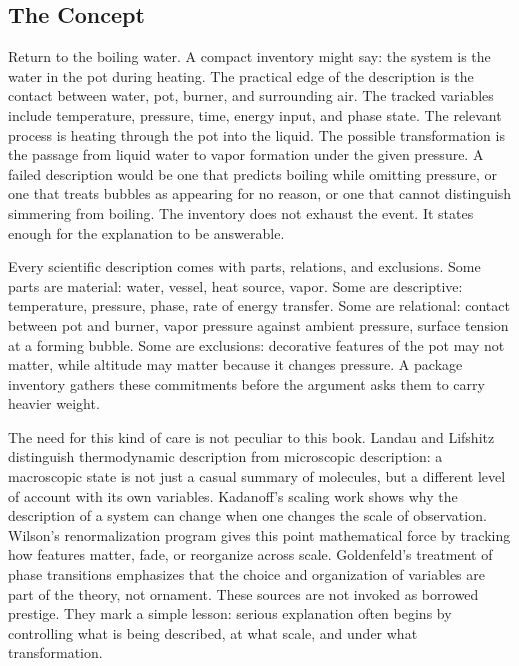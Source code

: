 \documentclass[11pt,a4paper,openany]{book}
\begin{document}
\subsection{The Concept}
Return to the boiling water. A compact inventory might say: the system is the water in the pot during heating. The practical edge of the description is the contact between water, pot, burner, and surrounding air. The tracked variables include temperature, pressure, time, energy input, and phase state. The relevant process is heating through the pot into the liquid. The possible transformation is the passage from liquid water to vapor formation under the given pressure. A failed description would be one that predicts boiling while omitting pressure, or one that treats bubbles as appearing for no reason, or one that cannot distinguish simmering from boiling. The inventory does not exhaust the event. It states enough for the explanation to be answerable. \cite{goldenfeld_lectures,kadanoff_scaling}\par
Every scientific description comes with parts, relations, and exclusions. Some parts are material: water, vessel, heat source, vapor. Some are descriptive: temperature, pressure, phase, rate of energy transfer. Some are relational: contact between pot and burner, vapor pressure against ambient pressure, surface tension at a forming bubble. Some are exclusions: decorative features of the pot may not matter, while altitude may matter because it changes pressure. A package inventory gathers these commitments before the argument asks them to carry heavier weight.\par
The need for this kind of care is not peculiar to this book. Landau and Lifshitz distinguish thermodynamic description from microscopic description: a macroscopic state is not just a casual summary of molecules, but a different level of account with its own variables. Kadanoff's scaling work shows why the description of a system can change when one changes the scale of observation. Wilson's renormalization program gives this point mathematical force by tracking how features matter, fade, or reorganize across scale. Goldenfeld's treatment of phase transitions emphasizes that the choice and organization of variables are part of the theory, not ornament. These sources are not invoked as borrowed prestige. They mark a simple lesson: serious explanation often begins by controlling what is being described, at what scale, and under what transformation.\par
\end{document}
